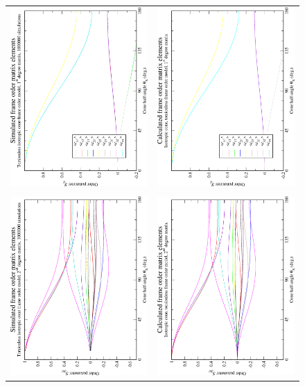 \begin{figure}
\centering
  \begin{tabular}{@{}cc@{}}
    \includegraphics[width=.35\textwidth,angle=270]{images/frame_order_matrix/Sij_iso_cone_torsionless_out_of_frame_theta_x_ens1000000.eps} &
    \includegraphics[width=.35\textwidth,angle=270]{images/frame_order_matrix/Sij_iso_cone_torsionless_out_of_frame_theta_x_calc.eps} \\
    \\[-5pt]
    \includegraphics[width=.35\textwidth,angle=270]{images/frame_order_matrix/Sijkl_iso_cone_torsionless_out_of_frame_theta_x_ens1000000.eps} &
    \includegraphics[width=.35\textwidth,angle=270]{images/frame_order_matrix/Sijkl_iso_cone_torsionless_out_of_frame_theta_x_calc.eps} \\

\end{tabular}
\end{figure}
